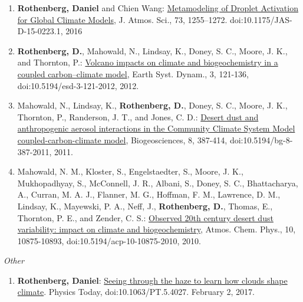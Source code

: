 \documentclass[11pt,letterpaper]{article}
\begin{document}
\begin{enumerate}[itemindent=-10pt]
 \item \textbf{Rothenberg, Daniel} and Chien Wang: \href{http://dx.doi.org/10.1175/JAS-D-15-0223.1}{Metamodeling of Droplet Activation for Global Climate Models}, J. Atmos. Sci., 73, 1255–1272. doi:10.1175/JAS-D-15-0223.1, 2016

 \item \textbf{Rothenberg, D.}, Mahowald, N., Lindsay, K., Doney, S. C., Moore, J. K., and Thornton, P.: \href{http://dx.doi.org/10.5194/esd-3-121-2012}{Volcano impacts on climate and biogeochemistry in a coupled carbon–climate model}, Earth Syst. Dynam., 3, 121-136, doi:10.5194/esd-3-121-2012, 2012.

 \item Mahowald, N., Lindsay, K., \textbf{Rothenberg, D.}, Doney, S. C., Moore, J. K., Thornton, P., Randerson, J. T., and Jones, C. D.: \href{http://dx.doi.org/10.5194/bg-8-387-2011}{Desert dust and anthropogenic aerosol interactions in the Community Climate System Model coupled-carbon-climate model}, Biogeosciences, 8, 387-414, doi:10.5194/bg-8-387-2011, 2011.

 \item Mahowald, N. M., Kloster, S., Engelstaedter, S., Moore, J. K., Mukhopadhyay, S., McConnell, J. R., Albani, S., Doney, S. C., Bhattacharya, A., Curran, M. A. J., Flanner, M. G., Hoffman, F. M., Lawrence, D. M., Lindsay, K., Mayewski, P. A., Neff, J., \textbf{Rothenberg, D.}, Thomas, E., Thornton, P. E., and Zender, C. S.: \href{http://dx.doi.org/10.5194/acp-10-10875-2010}{Observed 20th century desert dust variability: impact on climate and biogeochemistry}, Atmos. Chem. Phys., 10, 10875-10893, doi:10.5194/acp-10-10875-2010, 2010.
\end{enumerate}

\bigskip
\emph{Other}
\medskip
\begin{enumerate}[itemindent=-10pt]

\item \textbf{Rothenberg, Daniel}: \href{http://physicstoday.scitation.org/do/10.1063/PT.5.4027/full/}{Seeing through the haze to learn how clouds shape climate}. Physics Today, doi:10.1063/PT.5.4027. February 2, 2017.

\end{enumerate}
\end{document}
